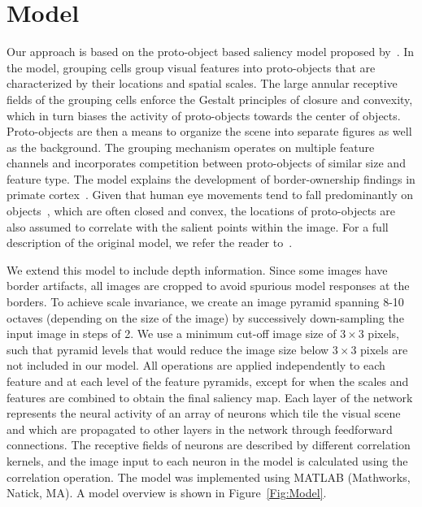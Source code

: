 \section{Model}
Our approach is based on the proto-object based saliency model proposed by~\cite{Russell_etal14}. In the model, grouping cells group visual features into proto-objects that are characterized by their locations and spatial scales. The large annular receptive fields of the grouping cells enforce the Gestalt principles of closure and convexity, which in turn biases the activity of proto-objects towards the center of objects. Proto-objects are then a means to organize the scene into separate figures as well as the background. The grouping mechanism operates on multiple feature channels and incorporates competition between proto-objects of similar size and feature type. The model explains the development of border-ownership findings in primate cortex~\citep{Craft_etal07,Zhou_etal00}. Given that human eye movements tend to fall predominantly on objects~\citep[][ but see~\cite{Borji_etal13} for a different view]{Einhauser_etal08a}, which are often closed and convex, the locations of proto-objects are also assumed to correlate with the salient points within the image. For a full description of the original model, we refer the reader to~\cite{Russell_etal14}.

We extend this model to include depth information. Since some images have border artifacts, all images are cropped to avoid spurious model responses at the borders. To achieve scale invariance, we create an image pyramid spanning 8-10 octaves (depending on the size of the image) by successively down-sampling the input image in steps of 2. We use a minimum cut-off image size of $3\times 3$ pixels, such that pyramid levels that would reduce the image size below $3\times 3$ pixels are not included in our model. All operations are applied independently to each feature and at each level of the feature pyramids, except for when the scales and features are combined to obtain the final saliency map. Each layer of the network represents the neural activity of an array of neurons which tile the visual scene and which are propagated to other layers in the network through feedforward connections. The receptive fields of neurons are described by different correlation kernels, and the image input to each neuron in the model is calculated using the correlation operation. The model was implemented using MATLAB (Mathworks, Natick, MA). A model overview is shown in Figure~\ref{Fig:Model}.

